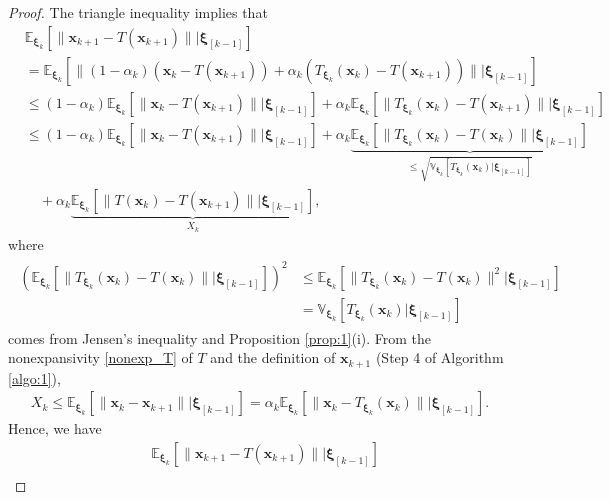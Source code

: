 \documentclass[smallextended,referee,envcountsect,]{svjour3}
\begin{document}
\begin{proof}
The triangle inequality implies that
\begin{align*}
&\mathbb{E}_{\bm{\xi}_k} \left[ \| \bm{x}_{k+1} - T (\bm{x}_{k+1}) \| \big| \bm{\xi}_{[k-1]} \right]\\
&=
\mathbb{E}_{\bm{\xi}_k} \left[ \| (1-\alpha_k) (\bm{x}_{k} - T (\bm{x}_{k+1})) + \alpha_k (T_{\bm{\xi}_k} (\bm{x}_{k}) - T (\bm{x}_{k+1})) \| \big| \bm{\xi}_{[k-1]} \right]\\
&\leq
(1-\alpha_k) \mathbb{E}_{\bm{\xi}_k} \left[ \| \bm{x}_{k} - T (\bm{x}_{k+1}) \| \big| \bm{\xi}_{[k-1]} \right]
+ \alpha_k \mathbb{E}_{\bm{\xi}_k} \left[ \| T_{\bm{\xi}_k} (\bm{x}_{k}) - T (\bm{x}_{k+1}) \| \big| \bm{\xi}_{[k-1]} \right]\\
&\leq
(1-\alpha_k) \mathbb{E}_{\bm{\xi}_k} \left[ \| \bm{x}_{k} - T (\bm{x}_{k+1}) \| \big| \bm{\xi}_{[k-1]} \right]
+ \alpha_k \underbrace{\mathbb{E}_{\bm{\xi}_k} \left[ \| T_{\bm{\xi}_k} (\bm{x}_{k}) - T (\bm{x}_{k}) \| \big| \bm{\xi}_{[k-1]} \right]}_{\leq \sqrt{\mathbb{V}_{\bm{\xi}_k} [ T_{\bm{\xi}_k} (\bm{x}_{k}) | \bm{\xi}_{[k-1]}]}}\\
&\quad 
+ \alpha_k 
\underbrace{\mathbb{E}_{\bm{\xi}_k} \left[ \| T (\bm{x}_{k}) - T (\bm{x}_{k+1}) \| \big| \bm{\xi}_{[k-1]} \right]}_{X_k},
\end{align*}
where 
\begin{align}\label{jensen}
\begin{split}
\left( \mathbb{E}_{\bm{\xi}_k} \left[ \| T_{\bm{\xi}_k} (\bm{x}_{k}) - T (\bm{x}_{k}) \| \big| \bm{\xi}_{[k-1]} \right] \right)^2 
&\leq 
\mathbb{E}_{\bm{\xi}_k} \left[ \| T_{\bm{\xi}_k} (\bm{x}_{k}) - T (\bm{x}_{k}) \|^2 \big| \bm{\xi}_{[k-1]} \right]\\
&= 
\mathbb{V}_{\bm{\xi}_k} \left[ T_{\bm{\xi}_k} (\bm{x}_{k}) \big| \bm{\xi}_{[k-1]} \right]
\end{split}
\end{align}
comes from Jensen's inequality and Proposition \ref{prop:1}(i). From the nonexpansivity \eqref{nonexp_T} of $T$ and the definition of $\bm{x}_{k+1}$ (Step 4 of Algorithm \ref{algo:1}), 
\begin{align*}
X_k 
\leq
\mathbb{E}_{\bm{\xi}_k} \left[ \| \bm{x}_{k} - \bm{x}_{k+1} \| \big| \bm{\xi}_{[k-1]} \right]
= \alpha_k \mathbb{E}_{\bm{\xi}_k} \left[ \| \bm{x}_{k} - T_{\bm{\xi}_k} (\bm{x}_{k}) \| \big| \bm{\xi}_{[k-1]} \right].
\end{align*}
Hence, we have 
\begin{align*}
&\mathbb{E}_{\bm{\xi}_k} \left[ \| \bm{x}_{k+1} - T (\bm{x}_{k+1}) \| \big| \bm{\xi}_{[k-1]} \right]\\

\end{align*}
\end{proof}
\end{document}
